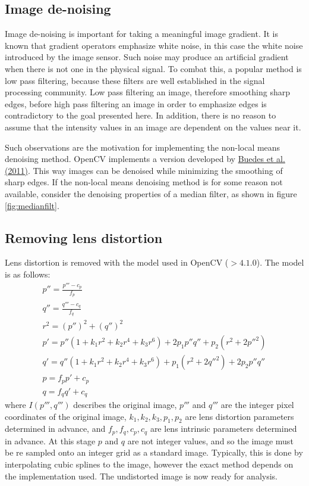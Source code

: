 \subsection{Image de-noising} \label{sec:imagedenoising}
\par
Image de-noising is important for taking a meaningful image gradient.
It is known that gradient operators emphasize white noise, in this case the white noise introduced by the image sensor.
Such noise may produce an artificial gradient when there is not one in the physical signal.
To combat this, a popular method is low pass filtering, because these filters are well established in the signal processing community.
Low pass filtering an image, therefore smoothing sharp edges, before high pass filtering an image in order to emphasize edges is contradictory to the goal presented here.
In addition, there is no reason to assume that the intensity values in an image are dependent on the values near it.
\par
Such observations are the motivation for implementing the non-local means denoising method.
OpenCV implements a version developed by \href{http://www.ipol.im/pub/art/2011/bcm_nlm/}{Buedes et al. (2011)}.
This way images can be denoised while minimizing the smoothing of sharp edges.
If the non-local means denoising method is for some reason not available, consider the denoising properties of a median filter, as shown in figure \ref{fig:medianfilt}.
%
\subsection{Removing lens distortion} \label{sec:lensdistortion}
\par
Lens distortion is removed with the model used in OpenCV ($>4.1.0$).
The model is as follows:
%
\begin{gather*}
	p'' = \frac{p''' - c_p}{f_p} \\
	q'' = \frac{q''' - c_q}{f_q} \\
	r^2 = (p'')^2 + (q'')^2 \\
	p' = p'' \left( 1 + k_1 r^2 + k_2 r^4 + k_3 r^6 \right) + 2p_1 p'' q'' + p_2(r^2 + 2 p''^2) \\
	q' = q'' \left( 1 + k_1 r^2 + k_2 r^4 + k_3 r^6 \right) + p_1 (r^2 + 2 q''^2) + 2 p_2 p'' q'' \\
	p = f_p p' + c_p \\
	q = f_q q' + c_q
\end{gather*}
%
where $I(p''',q''')$ describes the original image, $p'''$ and $q'''$ are the integer pixel coordinates of the original image, $k_1, k_2, k_3, p_1, p_2$ are lens distortion parameters determined in advance, and $f_p, f_q, c_p, c_q$ are lens intrinsic parameters determined in advance.
At this stage $p$ and $q$ are not integer values, and so the image must be re sampled onto an integer grid as a standard image.
Typically, this is done by interpolating cubic splines to the image, however the exact method depends on the implementation used.
The undistorted image is now ready for analysis.
%
